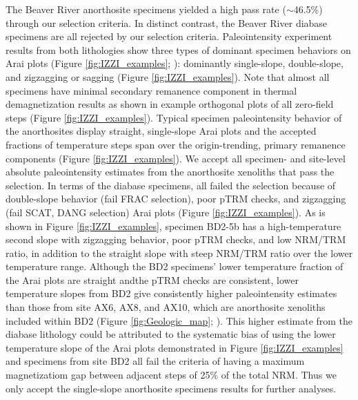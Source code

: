\documentclass[draft]{agujournal2019}
\begin{document}
The Beaver River anorthosite specimens yielded a high pass rate ($\sim$46.5\%) through our selection criteria. In distinct contrast, the Beaver River diabase specimens are all rejected by our selection criteria. Paleointensity experiment results from both lithologies show three types of dominant specimen behaviors on Arai plots (Figure \ref{fig:IZZI_examples}; ): dominantly single-slope, double-slope, and zigzagging or sagging (Figure \ref{fig:IZZI_examples}). Note that almost all specimens have minimal secondary remanence component in thermal demagnetization results as shown in example orthogonal plots of all zero-field steps (Figure \ref{fig:IZZI_examples}). Typical specimen paleointensity behavior of the anorthosites display straight, single-slope Arai plots and the accepted fractions of temperature steps span over the origin-trending, primary remanence components (Figure \ref{fig:IZZI_examples}). We accept all specimen- and site-level absolute paleointensity estimates from the anorthosite xenoliths that pass the selection. In terms of the diabase specimens, all failed the selection because of double-slope behavior (fail FRAC selection), poor pTRM checks, and zigzagging (fail SCAT, DANG selection) Arai plots (Figure \ref{fig:IZZI_examples}). As is shown in Figure \ref{fig:IZZI_examples}, specimen BD2-5b has a high-temperature second slope with zigzagging behavior, poor pTRM checks, and low NRM/TRM ratio, in addition to the straight slope with steep NRM/TRM ratio over the lower temperature range. Although the BD2 specimens' lower temperature fraction of the Arai plots are straight andthe pTRM checks are consistent, lower temperature slopes from BD2 give consistently higher paleointensity estimates than those from site AX6, AX8, and AX10, which are anorthosite xenoliths included within BD2 (Figure \ref{fig:Geologic_map}; ). This higher estimate from the diabase lithology could be attributed to the systematic bias of using the lower temperature slope of the Arai plots demonstrated in Figure \ref{fig:IZZI_examples} and specimens from site BD2 all fail the criteria of having a maximum magnetizatiom gap between adjacent steps of 25\% of the total NRM. Thus we only accept the single-slope anorthosite specimens results for further analyses. 

\end{document}
